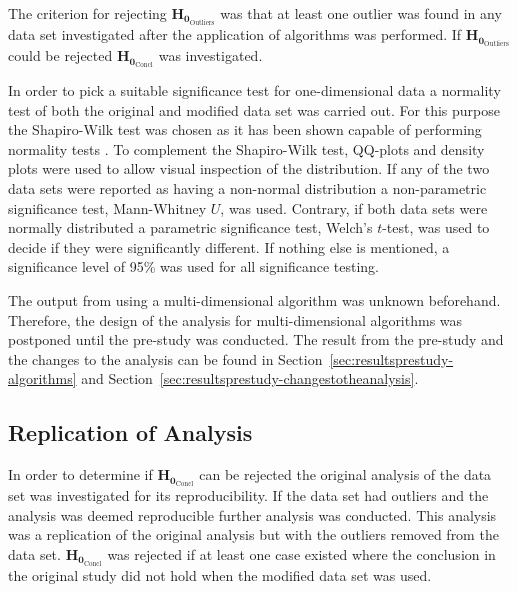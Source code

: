 The criterion for rejecting  $\mathbf{H_{0_{\mathrm{Outliers}}}}$ was that at least one outlier was found in any data set investigated after the application of algorithms was performed. If $\mathbf{H_{0_{\mathrm{Outliers}}}}$ could be rejected $\mathbf{H_{0_{\mathrm{Concl}}}}$ was investigated.




In order to pick a suitable significance test for one-dimensional data a normality test of both the original and modified data set was carried out. For this purpose the Shapiro-Wilk test was chosen as it has been shown capable of performing normality tests \citep{razali2011power}. To complement the Shapiro-Wilk test, QQ-plots and density plots were used to allow visual inspection of the distribution. If any of the two data sets were reported as having a non-normal distribution a non-parametric significance test, Mann-Whitney $U$, was used. Contrary, if both data sets were normally distributed a parametric significance test, Welch's $t$-test, was used to decide if they were significantly different. If nothing else is mentioned, a significance level of 95\% was used for all significance testing.




The output from using a multi-dimensional algorithm was unknown beforehand. Therefore, the design of the analysis for multi-dimensional algorithms was postponed until the pre-study was conducted. The result from the pre-study and the changes to the analysis can be found in Section~\ref{sec:resultsprestudy-algorithms} and Section~\ref{sec:resultsprestudy-changestotheanalysis}.




\subsection{Replication of Analysis}
\label{sec:method-repanalysis}
In order to determine if $\mathbf{H_{0_{\mathrm{Concl}}}}$ can be rejected the original analysis of the data set was investigated for its reproducibility. If the data set had outliers and the analysis was deemed reproducible further analysis was conducted. This analysis was a replication of the original analysis but with the outliers removed from the data set. $\mathbf{H_{0_{\mathrm{Concl}}}}$ was rejected if at least one case existed where the conclusion in the original study did not hold when the modified data set was used.

